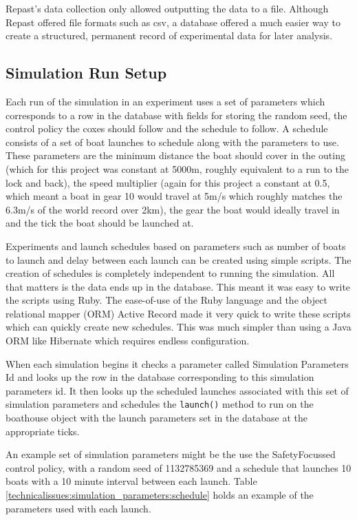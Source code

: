   Repast's data collection only allowed outputting the data to a file. Although Repast offered file formats such as csv, a database offered a much easier way to create a structured, permanent record of experimental data for later analysis.
  
  \subsection{Simulation Run Setup}
  Each run of the simulation in an experiment uses a set of parameters which corresponds to a row in the database with fields for storing the random seed, the control policy the coxes should follow and the schedule to follow. A schedule consists of a set of boat launches to schedule along with the parameters to use. These parameters are the minimum distance the boat should cover in the outing (which for this project was constant at 5000m, roughly equivalent to a run to the lock and back), the speed multiplier (again for this project a constant at 0.5, which meant a boat in gear 10 would travel at 5m/s which roughly matches the 6.3m/s of the world record over 2km), the gear the boat would ideally travel in and the tick the boat should be launched at.
  
  Experiments and launch schedules based on parameters such as number of boats to launch and delay between each launch can be created using simple scripts. The creation of schedules is completely independent to running the simulation. All that matters is the data ends up in the database. This meant it was easy to write the scripts using Ruby. The ease-of-use of the Ruby language and the object relational mapper (ORM) Active Record made it very quick to write these scripts which can quickly create new schedules. This was much simpler than using a Java ORM like Hibernate which requires endless configuration.
  
  When each simulation begins it checks a parameter called Simulation Parameters Id and looks up the row in the database corresponding to this simulation parameters id. It then looks up the scheduled launches associated with this set of simulation parameters and schedules the \texttt{launch()} method to run on the boathouse object with the launch parameters set in the database at the appropriate ticks.
  
    An example set of simulation parameters might be the use the SafetyFocussed control policy, with a random seed of 1132785369 and a schedule that launches 10 boats with a 10 minute interval between each launch. Table \ref{technicalissues:simulation_parameters:schedule} holds an example of the parameters used with each launch.
    
